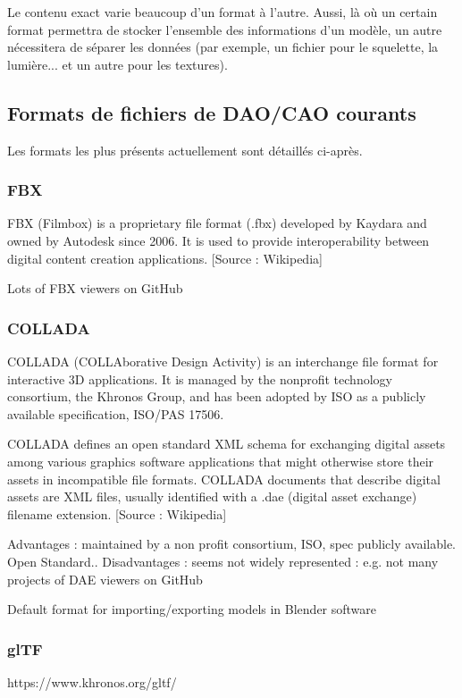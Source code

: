 Le contenu exact varie beaucoup d'un format à l'autre. Aussi, là où un certain format permettra de stocker l'ensemble des informations d'un modèle, un autre nécessitera de séparer les données (par exemple, un fichier pour le squelette, la lumière... et un autre pour les textures).  


\subsection{Formats de fichiers de DAO/CAO courants}

Les formats les plus présents actuellement sont détaillés ci-après.

\subsubsection{FBX}
FBX (Filmbox) is a proprietary file format (.fbx) developed by Kaydara and owned by Autodesk since 2006. It is used to provide interoperability between digital content creation applications. [Source : Wikipedia]

Lots of FBX viewers on GitHub

\subsubsection{COLLADA}
COLLADA (COLLAborative Design Activity) is an interchange file format for interactive 3D applications. It is managed by the nonprofit technology consortium, the Khronos Group, and has been adopted by ISO as a publicly available specification, ISO/PAS 17506.

COLLADA defines an open standard XML schema for exchanging digital assets among various graphics software applications that might otherwise store their assets in incompatible file formats. COLLADA documents that describe digital assets are XML files, usually identified with a .dae (digital asset exchange) filename extension. [Source : Wikipedia]

Advantages : maintained by a non profit consortium, ISO, spec publicly available. Open Standard..
Disadvantages : seems not widely represented : e.g. not many projects of DAE viewers on GitHub

Default format for importing/exporting models in Blender software

\subsubsection{glTF}
\label{sec:glTF}
https://www.khronos.org/gltf/

